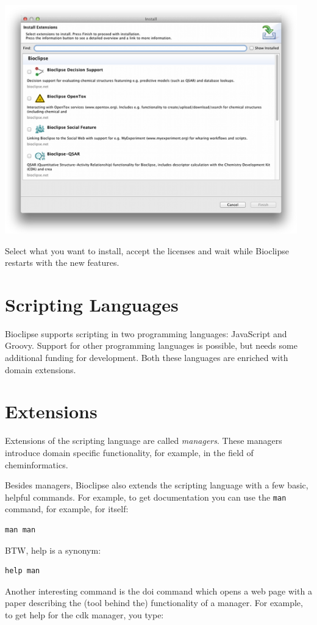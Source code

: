 \documentclass[a5paper, 10pt]{memoir}
\begin{document}
\begin{refsection}
\begin{center}
\includegraphics[width=0.95\textwidth]{images/installFeatures.png}
\end{center}
Select what you want to install, accept the licenses and wait while Bioclipse
restarts with the new features.


\section{Scripting Languages}

Bioclipse supports scripting in two programming languages:
JavaScript and Groovy. Support for other
programming languages is possible, but needs some additional funding for
development. Both these languages are enriched with domain extensions.

\section{Extensions}

Extensions of the scripting language are called \emph{managers}.
These managers introduce domain specific functionality, for
example, in the field of cheminformatics.

Besides managers, Bioclipse also extends the scripting language with a few
basic, helpful commands. For example, to get documentation you can use the
\texttt{man} command, for example, for itself:
\begin{Verbatim}
man man
\end{Verbatim}
BTW, help is a synonym:
\begin{Verbatim}
help man
\end{Verbatim}
Another interesting command is the doi command which opens a web page with a
paper describing the (tool behind the) functionality of a manager. For example,
to get help for the cdk manager, you type:


\end{refsection}
\end{document}
